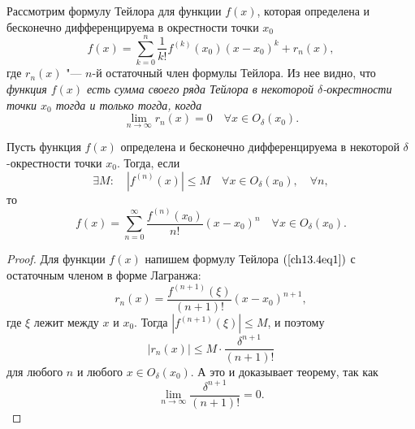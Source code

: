 Рассмотрим формулу Тейлора для функции $f(x)$, которая определена и бесконечно дифференцируема в окрестности точки $x_0$
\begin{equation} \label{ch13.4eq1}
f(x) = \sum\limits_{k = 0}^{n} \frac{1}{k!}f^{(k)}(x_0)(x - x_0)^k + r_n(x),
\end{equation}
где $r_n(x)$ "--- $n$-й остаточный член формулы Тейлора. Из нее видно, что \textit{функция $f(x)$ есть сумма своего ряда Тейлора в некоторой $\delta$-окрестности точки $x_0$ тогда и только тогда, когда}
$$
\lim\limits_{n \to \infty} r_n(x) = 0 \quad \forall x \in O_\delta(x_0).
$$
\begin{thm}
Пусть функция $f(x)$ определена и бесконечно дифференцируема в некоторой $\delta$-окрестности точки $x_0$. Тогда, если
$$
\exists M: \quad |f^{(n)}(x)| \le M \quad \forall x \in O_\delta(x_0), \quad \forall n,
$$ 
то
$$
f(x) = \sum\limits_{n = 0}^{\infty} \frac{f^{(n)}(x_0)}{n!}(x - x_0)^n \quad \forall x \in O_\delta(x_0).
$$
\end{thm}
\begin{proof}
Для функции $f(x)$ напишем формулу Тейлора $(\ref{ch13.4eq1})$ с остаточным членом в форме Лагранжа:
$$
r_n(x) = \frac{f^{(n+1)}(\xi)}{(n + 1)!} (x - x_0)^{n + 1},
$$
где $\xi$ лежит между $x$ и $x_0$. Тогда $|f^{(n+1)}(\xi)| \le M$, и поэтому
$$
|r_n(x)| \le M \cdot \frac{\delta^{n + 1}}{(n + 1)!}
$$
для любого $n$ и любого $x \in O_\delta(x_0)$. А это и доказывает теорему, так как
$$
\lim\limits_{n \to \infty} \frac{\delta^{n + 1}}{(n + 1)!} = 0.
$$
\end{proof}